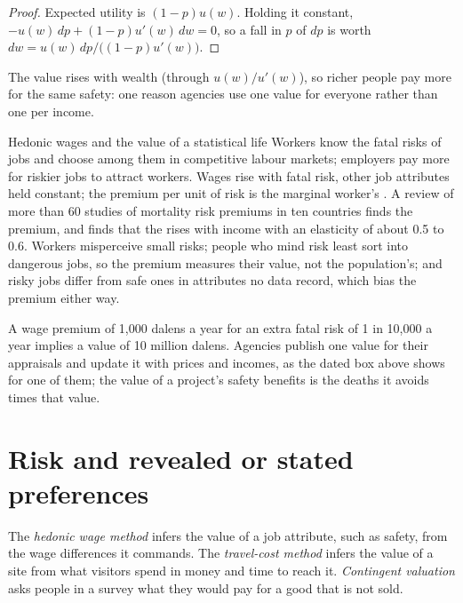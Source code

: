 \begin{proof}
Expected utility is $(1 - p)u(w)$. Holding it constant, $-u(w)\,dp + (1 - p)u'(w)\,dw = 0$, so a fall in $p$ of
$dp$ is worth $dw = u(w)\,dp/\big((1 - p)u'(w)\big)$.
\end{proof}

The value rises with wealth (through $u(w)/u'(w)$), so richer people pay more for the
same safety: one reason agencies use one value for everyone rather than one per
income.

\begin{model}{Hedonic wages and the value of a statistical life}
\assumes Workers know the fatal risks of jobs and choose among them in competitive
labour markets; employers pay more for riskier jobs to attract workers.
\predicts Wages rise with fatal risk, other job attributes held constant; the
premium per unit of risk is the marginal worker's .
\tested A review of more than 60 studies of mortality risk premiums in ten
countries finds the premium, and finds that the  rises
with income with an elasticity of about 0.5 to 0.6. %
\breaks Workers misperceive small risks; people who mind risk least sort into
dangerous jobs, so the premium measures their value, not the population's; and
risky jobs differ from safe ones in attributes no data record, which bias the
premium either way.
\end{model}

\begin{measure}
A wage premium of 1{,}000 dalens a year for an extra fatal risk of 1 in 10{,}000 a year
implies a value of 10 million dalens. Agencies publish one value for their
appraisals and update it with prices and incomes, as the dated box above shows for
one of them; the value of a project's safety benefits is the deaths it avoids times
that value.
\end{measure}

\section{Risk and revealed or stated preferences}\label{sec:b3:cost-benefit-analysis:preferences}

\begin{definition}\label{def:b3:cost-benefit-analysis:valuation}
The \emph{hedonic wage method} infers the value of a job attribute, such as safety,
from the wage differences it commands. The \emph{travel-cost method} infers the value
of a site from what visitors spend in money and time to reach it. \emph{Contingent
valuation} asks people in a survey what they would pay for a good that is not sold.
\end{definition}

